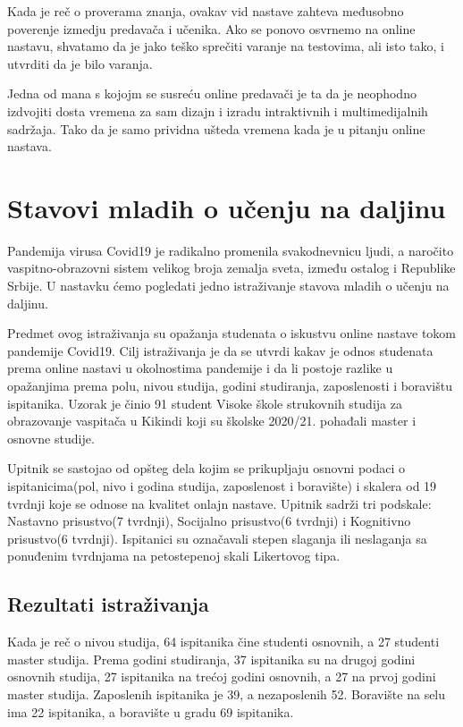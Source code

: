 \documentclass{article}
\begin{document}
Kada je reč o proverama znanja, ovakav vid nastave zahteva međusobno poverenje izmedju predavača i učenika. Ako se ponovo osvrnemo na online nastavu, shvatamo da je jako teško sprečiti varanje na testovima, ali isto tako, i utvrditi da je bilo varanja. 

Jedna od mana s kojojm se susreću online predavači je ta da je neophodno izdvojiti dosta vremena za sam dizajn i izradu intraktivnih i multimedijalnih sadržaja. Tako da je samo prividna ušteda vremena kada je u pitanju online nastava.

\section{Stavovi mladih o učenju na daljinu}

Pandemija virusa Covid19 je radikalno promenila svakodnevnicu ljudi, a naročito vaspitno-obrazovni sistem velikog broja zemalja sveta, između ostalog i Republike Srbije. U nastavku ćemo pogledati jedno istraživanje stavova mladih o učenju na daljinu.

Predmet ovog istraživanja su opažanja studenata o iskustvu online nastave tokom pandemije Covid19. Cilj istraživanja je da se utvrdi kakav je odnos studenata prema online nastavi u okolnostima pandemije i da li postoje razlike u opažanjima prema polu, nivou studija, godini studiranja, zaposlenosti i boravištu ispitanika. Uzorak je činio 91 student Visoke škole strukovnih studija za obrazovanje vaspitača u Kikindi koji su školske 2020/21. pohađali master i osnovne studije.

Upitnik se sastojao od opšteg dela kojim se prikupljaju osnovni podaci o ispitanicima(pol, nivo i godina studija, zaposlenost i boravište) i skalera od 19 tvrdnji koje se odnose na kvalitet onlajn nastave. Upitnik sadrži tri podskale: Nastavno prisustvo(7 tvrdnji), Socijalno prisustvo(6 tvrdnji) i Kognitivno prisustvo(6 tvrdnji). Ispitanici su označavali stepen slaganja ili neslaganja sa ponuđenim tvrdnjama na petostepenoj skali Likertovog tipa.\cite{6}

\subsection{Rezultati istraživanja}

 Kada je reč o nivou studija, 64 ispitanika čine studenti osnovnih, a 27 studenti master studija. Prema godini studiranja, 37 ispitanika su na drugoj godini osnovnih studija, 27 ispitanika na trećoj godini osnovnih, a 27 na prvoj godini master studija. Zaposlenih ispitanika je 39, a nezaposlenih 52. Boravište na selu ima 22 ispitanika, a boravište u gradu 69 ispitanika.
\end{document}
